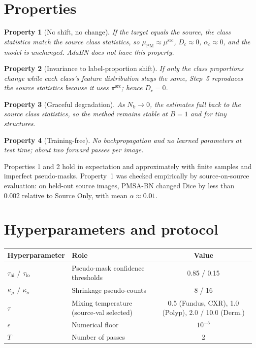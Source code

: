 \documentclass[11pt,a4paper]{article}
\newtheorem{property}{Property}
\newcommand{\src}{\mathrm{src}}
\newcommand{\PM}{\mathrm{PM}}
\begin{document}
\section{Properties}

\begin{property}[No shift, no change]
If the target equals the source, the class statistics match the source class statistics, so $\mu_{\PM}\approx\mu^{\src}$, $D_c\approx 0$, $\alpha_c\approx 0$, and the model is unchanged. AdaBN does not have this property.
\end{property}
\begin{property}[Invariance to label-proportion shift]
If only the class proportions change while each class's feature distribution stays the same, Step~5 reproduces the source statistics because it uses $\pi^{\src}$; hence $D_c=0$.
\end{property}
\begin{property}[Graceful degradation]
As $N_k\to 0$, the estimates fall back to the source class statistics, so the method remains stable at $B=1$ and for tiny structures.
\end{property}
\begin{property}[Training-free]
No backpropagation and no learned parameters at test time; about two forward passes per image.
\end{property}

\noindent Properties 1 and 2 hold in expectation and approximately with finite samples and imperfect pseudo-masks. Property~1 was checked empirically by source-on-source evaluation: on held-out source images, PMSA-BN changed Dice by less than $0.002$ relative to Source Only, with mean $\alpha\approx 0.01$.

\section{Hyperparameters and protocol}
\label{sec:hyper}

\begin{table}[h]
\centering
\begin{tabular}{@{}llc@{}}
\toprule
Hyperparameter & Role & Value \\
\midrule
$\tau_{\mathrm{hi}}$ / $\tau_{\mathrm{lo}}$ & Pseudo-mask confidence thresholds & 0.85 / 0.15 \\
$\kappa_\mu$ / $\kappa_\sigma$ & Shrinkage pseudo-counts & 8 / 16 \\
$\tau$ & Mixing temperature (source-val selected) & 0.5 (Fundus, CXR), 1.0 (Polyp), 2.0 / 10.0 (Derm.) \\
$\epsilon$ & Numerical floor & $10^{-5}$ \\
$T$ & Number of passes & 2 \\
\bottomrule
\end{tabular}
\end{table}
\end{document}
